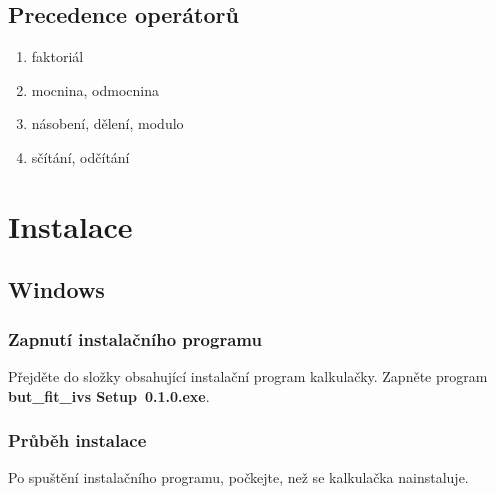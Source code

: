 \documentclass[12pt,czech]{article}
\begin{document}
\subsection{Precedence operátorů}
\begin{enumerate}
  \item faktoriál
  \item mocnina, odmocnina
  \item násobení, dělení, modulo
  \item sčítání, odčítání
\end{enumerate}


\newpage

\section{Instalace}
\smallskip
\subsection{Windows}
\subsubsection*{Zapnutí instalačního programu}
Přejděte do složky obsahující instalační program kalkulačky. \newline
Zapněte program \textbf{but\_fit\_ivs Setup~0.1.0.exe}.

\subsubsection*{Průběh instalace}
Po spuštění instalačního programu, počkejte, než se kalkulačka nainstaluje.
\begin{figure}[h]
\centering
{}
\end{figure}
\end{document}
